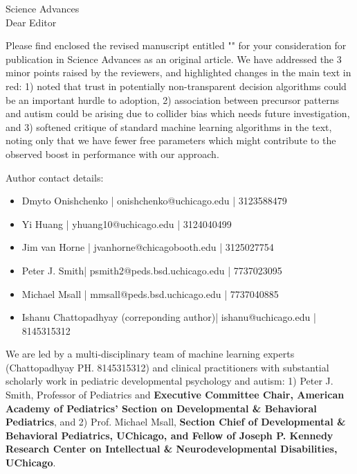\documentclass[9pt,onecolumn,compsoc]{IEEEtran}
\newcommand{\Space}{\vspace{10pt}}
\def\BEDITOR{Editor\xspace}
\def\JNAME{Science Advances\xspace}
\def\JADDR{}
\begin{document}
\parskip=12pt
\parindent=0pt
\Space
\Space
\fontsize{11}{12}\selectfont
\Space

\JNAME\\
\JADDR

Dear \BEDITOR

Please find enclosed the  revised manuscript entitled "\textbf{\TITLE}" for your consideration for publication in \JNAME as an original article. We have addressed the 3 minor points raised by the reviewers, and highlighted changes in the main  text in red: 1) noted that trust in potentially non-transparent decision algorithms could be an important hurdle to adoption, 2) association between precursor patterns and autism could be arising due to collider bias which needs future investigation, and 3) softened critique of standard machine learning algorithms in the text, noting only that we have fewer free parameters which might contribute to the observed boost in performance with our approach.



Author contact details:
\vspace{-10pt}

\begin{itemize}
\item Dmyto Onishchenko | onishchenko@uchicago.edu |
 3123588479
\item Yi Huang | yhuang10@uchicago.edu | 3124040499
\item Jim van Horne | jvanhorne@chicagobooth.edu | 3125027754
\item Peter J. Smith|  psmith2@peds.bsd.uchicago.edu | 7737023095
\item Michael Msall |  mmsall@peds.bsd.uchicago.edu | 7737040885
\item Ishanu Chattopadhyay (correponding author)|  ishanu@uchicago.edu | 8145315312
\end{itemize}

We are led by a multi-disciplinary team  of machine learning experts (Chattopadhyay PH. 8145315312) and clinical practitioners with substantial scholarly  work in pediatric developmental psychology and autism: 1) Peter J. Smith, Professor of Pediatrics and \textbf{Executive Committee Chair, American Academy of Pediatrics' Section on Developmental \& Behavioral
Pediatrics}, and 2) Prof. Michael Msall, \textbf{Section Chief of Developmental \& Behavioral Pediatrics, UChicago, and Fellow of Joseph  P. Kennedy Research Center on Intellectual \& Neurodevelopmental Disabilities, UChicago}.
 
\end{document}

